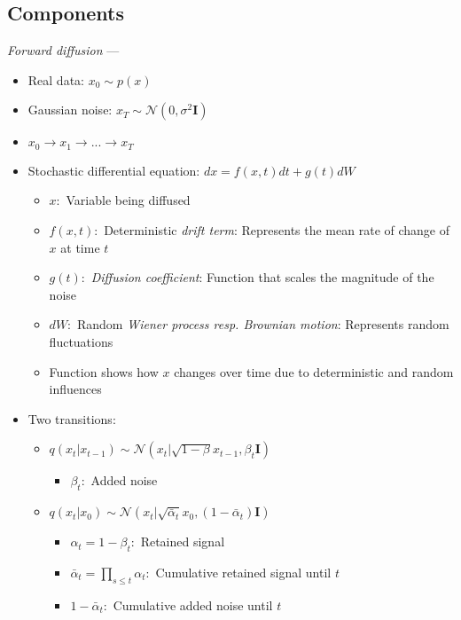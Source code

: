 \subsection*{Components}
\emph{Forward diffusion} --- 
\begin{itemize}
    \item Real data: $x_0 \sim p(x)$
    \item Gaussian noise: $x_T \sim \mathcal{N}(0,\sigma^2 \boldsymbol{I})$
    \item $x_0 \rightarrow x_1 \rightarrow ... \rightarrow x_T$
    \item Stochastic differential equation: $dx = f(x,t)dt + g(t) dW$
    \begin{itemize}
        \item $x:$ Variable being diffused
        \item $f(x,t):$ Deterministic \emph{drift term}: Represents the mean rate of change of $x$ at time $t$
        \item $g(t):$ \emph{Diffusion coefficient}: Function that scales the magnitude of the noise
        \item $dW:$ Random \emph{Wiener process resp. Brownian motion}: Represents random fluctuations
        \item Function shows how $x$ changes over time due to deterministic and random influences
    \end{itemize}
    \item Two transitions:
    \begin{itemize}
        \item $q(x_t | x_{t-1}) \sim \mathcal{N}(x_t | \sqrt{1-\beta} x_{t-1}, \beta_t \boldsymbol{I} )$
        \begin{itemize}
            \item $\beta_t:$ Added noise
        \end{itemize}
        \item $q(x_t | x_0) \sim \mathcal{N}(x_t | \sqrt{\bar{\alpha}_t} x_0, (1-\bar{\alpha}_t) \boldsymbol{I} )$
        \begin{itemize}
            \item $\alpha_t = 1-\beta_t:$ Retained signal
            \item $\bar{\alpha}_t = \prod_{s \leq t} \alpha_t:$ Cumulative retained signal until $t$
            \item $1-\bar{\alpha}_t:$ Cumulative added noise until $t$
        \end{itemize}
    \end{itemize}
\end{itemize}

